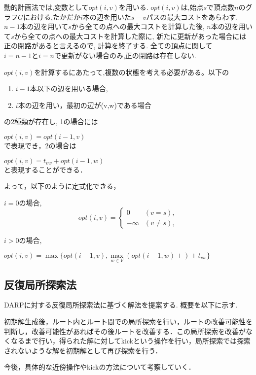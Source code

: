 \documentclass[a4j,11pt,twocolumn]{jsarticle}
\begin{document}
動的計画法では,変数として$opt(i,v)$を用いる. $opt(i,v)$は,始点$s$で頂点数$n$のグラフ$G$における,たかだか$i$本の辺を用いた$s-v$パスの最大コストをあらわす. $n-1$本の辺を用いて$s$から全ての点への最大コストを計算した後, $n$本の辺を用いて$s$から全ての点への最大コストを計算した際に, 新たに更新があった場合には正の閉路があると言えるので, 計算を終了する.
全ての頂点に関して$i=n-1とi=n$で更新がない場合のみ,正の閉路は存在しない.

$opt(i,v)$を計算するにあたって,複数の状態を考える必要がある。以下の
\begin{enumerate}
  \item $i-1$本以下の辺を用いる場合,
  \item $i$本の辺を用い，最初の辺が(v,w)である場合
\end{enumerate}
の2種類が存在し, 1の場合には

$opt(i,v) = opt(i-1,v)$\\
で表現でき，2の場合は

$opt(i,v) = t_{vw} + opt(i-1,w)$\\
と表現することができる．

よって，以下のように定式化できる，

$i=0$の場合,
\[
  opt(i,v) = \begin{cases}
    0 & (v=s), \\
    -\infty & (v \not= s),
  \end{cases}
\]

$i>0$の場合,

$opt(i,v) = \max \{opt(i-1,v), \underset{w \in V}{\max}(opt(i-1,w)+) +t_{vw}\}$\\

\subsection{{\large 反復局所探索法}}
DARPに対する反復局所探索法に基づく解法を提案する. 概要を以下に示す.

初期解生成後，ルート内とルート間での局所探索を行い，ルートの改善可能性を判断し，改善可能性があればその後ルートを改善する．この局所探索を改善がなくなるまで行い，得られた解に対してkickという操作を行い，局所探索では探索されないような解を初期解として再び探索を行う．

今後，具体的な近傍操作やkickの方法について考察していく．
\end{document}
